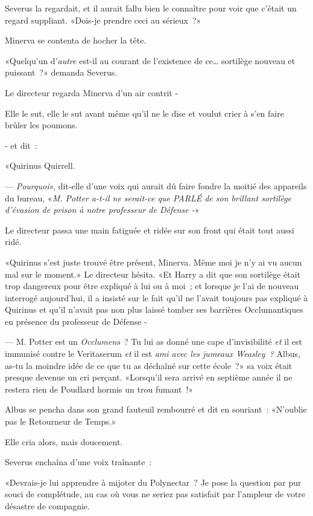 Severus la regardait, et il aurait fallu bien le connaître pour voir que c'était un regard suppliant. «Dois-je prendre ceci au sérieux~?»

Minerva se contenta de hocher la tête.

«Quelqu'un d'\emph{autre} est-il au courant de l'existence de ce… sortilège nouveau et puissant~?» demanda Severus.

Le directeur regarda Minerva d'un air contrit -

Elle le sut, elle le sut avant même qu'il ne le dise et voulut crier à s'en faire brûler les poumons.

- et dit~:

«Quirinus Quirrell.

--- \emph{Pourquoi}», dit-elle d'une voix qui aurait dû faire fondre la moitié des appareils du bureau, «\emph{M. Potter a-t-il ne serait-ce que PARLÉ de son brillant sortilège d'évasion de prison à notre professeur de Défense -}»

Le directeur passa une main fatiguée et ridée sur son front qui était tout aussi ridé.

«Quirinus s'est juste trouvé être présent, Minerva. Même moi je n'y ai vu aucun mal sur le moment.» Le directeur hésita. «Et Harry a dit que son sortilège était trop dangereux pour être expliqué à lui ou à moi~; et lorsque je l'ai de nouveau interrogé aujourd'hui, il a insisté sur le fait qu'il ne l'avait toujours pas expliqué à Quirinus et qu'il n'avait pas non plus laissé tomber ses barrières Occlumantiques en présence du professeur de Défense -

--- M. Potter est un \emph{Occlumens}~? Tu lui as donné une cape d'invisibilité \emph{et} il est immunisé contre le Veritaserum \emph{et} il est \emph{ami avec les jumeaux Weasley~?} Albus, as-tu la moindre idée de ce que tu as déchaîné sur cette école~?» sa voix était presque devenue un cri perçant. «Lorsqu'il sera arrivé en septième année il ne restera rien de Poudlard hormis un trou fumant~!»

Albus se pencha dans son grand fauteuil rembourré et dit en souriant~: «N'oublie pas le Retourneur de Temps.»

Elle cria alors, mais doucement.

Severus enchaîna d'une voix traînante~:

«Devrais-je lui apprendre à mijoter du Polynectar~? Je pose la question par pur souci de complétude, au cas où vous ne seriez pas satisfait par l'ampleur de votre désastre de compagnie.

